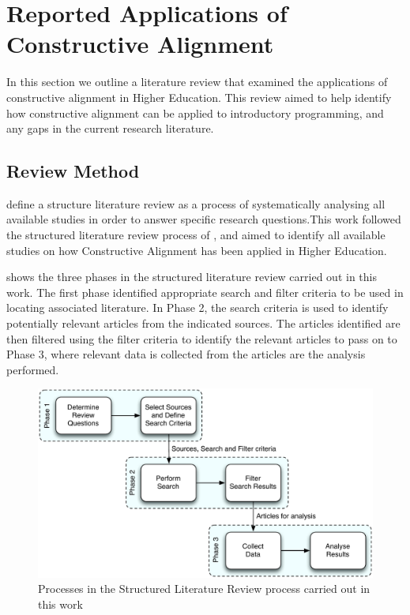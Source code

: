 


\clearpage
\section{Reported Applications of Constructive Alignment} %
\label{sec:reported_applications_of_constructive_alignment}

In this section we outline a literature review that examined the applications of constructive alignment in Higher Education. This review aimed to help identify how constructive alignment can be applied to introductory programming, and any gaps in the current research literature. 

\subsection{Review Method} %
\label{sub:review_method}

\citet{Petticrew:2008} define a structure literature review as a process of systematically analysing all available studies in order to answer specific research questions.This work followed the structured literature review process of \citet{Kitchenham:2004}, and aimed to identify all available studies on how Constructive Alignment has been applied in Higher Education.

 shows the three phases in the structured literature review carried out in this work. The first phase identified appropriate search and filter criteria to be used in locating associated literature. In Phase 2, the search criteria is used to identify potentially relevant articles from the indicated sources. The articles identified are then filtered using the filter criteria to identify the relevant articles to pass on to Phase 3, where relevant data is collected from the articles are the analysis performed.

\begin{figure}[tbph]
	\centering
	\includegraphics[width=\textwidth]{SystematicReview}
	\caption{Processes in the Structured Literature Review process carried out in this work}
	\label{fig:struct_review_proc}
\end{figure}



